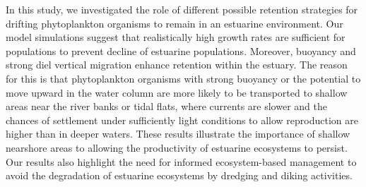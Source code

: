 \documentclass[npg, manuscript]{copernicus}
\begin{document}
\conclusions  %
In this study, we investigated the role of different possible retention strategies for drifting phytoplankton organisms to remain in an estuarine environment.
Our model simulations suggest that realistically high growth rates are sufficient for populations to prevent decline of estuarine populations.
Moreover, buoyancy and strong diel vertical migration enhance retention within the estuary.
The reason for this is that phytoplankton organisms with strong buoyancy or the potential to move upward in the water column are more likely to be transported to shallow areas near the river banks or tidal flats, where currents are slower and the chances of settlement under sufficiently light conditions to allow reproduction are higher than in deeper waters.
These results illustrate the importance of shallow nearshore areas to allowing the productivity of estuarine ecosystems to persist.
Our results also highlight the need for informed ecosystem-based management to avoid the degradation of estuarine ecosystems by dredging and diking activities.











\end{document}
